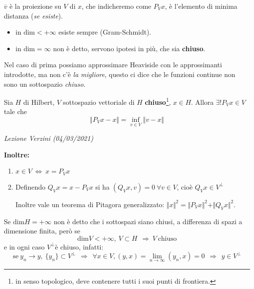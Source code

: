 \documentclass[10pt,a4paper,twoside,openright]{book}
\newcounter{conteggioV}
\newcommand{\LezioneV}[1]{
	\stepcounter{conteggioV}
	\textit{Lezione Verzini \arabic{conteggioV} (#1)}
	}
\begin{document}
$\displaystyle \overline{v}$ è la proiezione su $V$ di $x$, che indicheremo come $P_{V} x$, è l'elemento di minima distanza (\textit{se esiste}).
\begin{itemize}
	\item in $\mathrm{dim} < +\infty $ esiste sempre (Gram-Schmidt).
	\item in $\mathrm{dim} =\infty $ non è detto, servono ipotesi in più, che sia \textbf{chiuso}.
\end{itemize}

Nel caso di prima possiamo approssimare Heaviside con le approssimanti introdotte, ma non c'è \textit{la migliore}, questo ci dice che le funzioni continue non sono un sottospazio \textit{chiuso}.
\begin{theorem}
	 Sia $H$ di Hilbert, $V$ sottospazio vettoriale di $H$ \textbf{chiuso}\footnote{in senso topologico, deve contenere tutti i suoi punti di frontiera.}, $x\in H$. Allora $\exists !P_{V} x\in V$ tale che
	\begin{equation*}
		\Vert P_{V} x-x\Vert =\inf_{v\in V}\Vert v-x\Vert 
	\end{equation*}
	\LezioneV{04/03/2021}
	
	\textbf{Inoltre:}
	\begin{enumerate}
		\item $\displaystyle x\in V\ \Leftrightarrow \ x=P_{V} x$
		\item Definendo $\displaystyle Q_{V} x=x-P_{V} x$ si ha $(Q_{V} x,v) =0\ \forall v\in V$, cioè $\displaystyle Q_{V} x\in V^{\bot }$

		Inoltre vale un teorema di Pitagora generalizzato: $\Vert x\Vert ^{2} =\Vert P_{V} x\Vert ^{2} +\Vert Q_{V} x\Vert ^{2}$.
	\end{enumerate}
\end{theorem}
\begin{nb}
	Se $\displaystyle \mathrm{dim} H\mathrm{=+\infty }$ non è detto che i sottospazi siano chiusi, a differenza di spazi a dimensione finita, però se
	\begin{equation*}
		\mathrm{dim} V< +\infty,\ V\subset H\ \ \Rightarrow \ V\ \text{chiuso}
	\end{equation*}
	e in ogni caso $\displaystyle V^{\bot }$è chiuso, infatti:
	\begin{equation*}
		\text{se} \ y_{n}\rightarrow y,\ \{y_{n}\} \subset V^{\bot } \ \ \Rightarrow \ \ \forall x\in V,( y,x) =\lim _{n\rightarrow \infty }( y_{n} ,x) =0\ \ \Rightarrow \ \ y\in V^{\bot }
	\end{equation*}
\end{nb}
\end{document}
